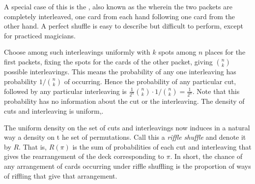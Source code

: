 \documentclass[12pt]{article}
\begin{document}
A special case of this is the ,%
also known as the  wherein the two packets are
completely interleaved, one card from each hand following one card from
the other hand.  A perfect shuffle is easy to describe but difficult to
perform, except for practiced magicians.

Choose among such interleavings uniformly with \( k \) spots among \( n \)
places for the first packets, fixing the spots for the cards of the
other packet, giving \( \binom{n}{k} \) possible interleavings.  This
means the probability of any one interleaving has probability \( 1/\binom
{n}{k} \) of occurring. Hence the probability of any particular cut,
followed by any particular interleaving is \( \frac{1}{2^n}\binom{n}{k}
\cdot 1/\binom{n}{k} = \frac{1}{2^n} \).  Note that this probability has
no information about the cut or the interleaving.  The density of cuts
and interleaving is uniform,.

The uniform density on the set of cuts and interleavings now induces in
a natural way a density on t he set of permutations.  Call this a \emph{riffle
shuffle} and denote it by \( R \).  That is, \( R(\pi) \) is the sum of
probabilities of each cut and interleaving that gives the rearrangement
of the deck corresponding to \( \pi \).  In short, the chance of any
arrangement of cards occurring under riffle shuffling is the proportion
of ways of riffling that give that arrangement.
\end{document}
